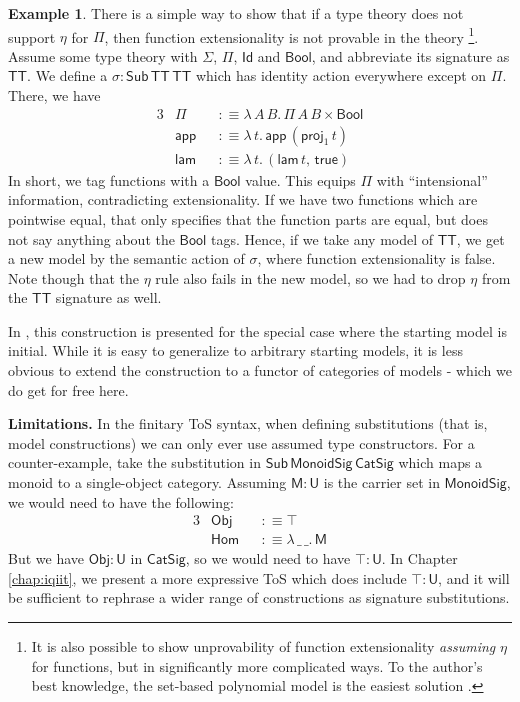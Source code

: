 \documentclass[12pt,a4paper,twoside,openany]{book}
\theoremstyle{remark}
\theoremstyle{definition}
\newtheorem{myexample}{Example}
\theoremstyle{theorem}
\newcommand{\ms}[1]{\mathsf{#1}}
\newcommand{\Sub}{\mathsf{Sub}}
\newcommand{\U}{\mathsf{U}}
\newcommand{\Id}{\mathsf{Id}}
\newcommand{\proj}{\mathsf{proj}}
\newcommand{\app}{\ms{app}}
\newcommand{\Obj}{\ms{Obj}}
\newcommand{\Bool}{\ms{Bool}}
\newcommand{\lam}{\ms{lam}}
\newcommand{\true}{\ms{true}}
\newcommand{\defn}{:\equiv}
\begin{document}
\begin{myexample}
There is a simple way to show that if a type theory does not support $\eta$ for
$\Pi$, then function extensionality is not provable in the theory
\cite{next700}\footnote{It is also possible to show unprovability of function
extensionality \emph{assuming} $\eta$ for functions, but in significantly more
complicated ways. To the author's best knowledge, the set-based polynomial model
is the easiest solution \cite{von2015polynomials}.}.  Assume some type theory with $\Sigma$,
$\Pi$, $\Id$ and $\Bool$, and abbreviate its signature as $\ms{TT}$. We define a
$\sigma : \Sub\,\ms{TT}\,\ms{TT}$ which has identity action everywhere except on
$\Pi$. There, we have
\begin{alignat*}{3}
  &\Pi    &&\defn \lambda\,A\,B.\,\Pi\,A\,B \times \Bool \\
  &\app   &&\defn \lambda\,t.\,\app\,(\proj_1\,t)\\
  &\lam   &&\defn \lambda\,t.\,(\lam\,t,\,\true)
\end{alignat*}
In short, we tag functions with a $\Bool$ value. This equips $\Pi$ with
``intensional'' information, contradicting extensionality. If we have two
functions which are pointwise equal, that only specifies that the function parts
are equal, but does not say anything about the $\Bool$ tags. Hence, if we take
any model of $\ms{TT}$, we get a new model by the semantic action of $\sigma$,
where function extensionality is false. Note though that the $\eta$ rule also
fails in the new model, so we had to drop $\eta$ from the $\ms{TT}$ signature
as well.

In \cite{next700}, this construction is presented for the special case where the
starting model is initial. While it is easy to generalize to arbitrary starting
models, it is less obvious to extend the construction to a functor of categories
of models - which we do get for free here.
\end{myexample}

\textbf{Limitations.} In the finitary ToS syntax, when defining substitutions
(that is, model constructions) we can only ever use assumed type constructors.
For a counter-example, take the substitution in
$\Sub\,\ms{MonoidSig}\,\ms{CatSig}$ which maps a monoid to a single-object
category. Assuming $\ms{M} : \U$ is the carrier set in $\ms{MonoidSig}$, we would
need to have the following:
\begin{alignat*}{3}
  &\ms{Obj} &&\defn \top \\
  &\ms{Hom} &&\defn \lambda\,\_\,\_.\, \ms{M}
\end{alignat*}
But we have $\Obj : \U$ in $\ms{CatSig}$, so we would need to have $\top : \U$.
In Chapter \ref{chap:iqiit}, we present a more expressive ToS which does include
$\top : \U$, and it will be sufficient to rephrase a wider range of constructions
as signature substitutions.
\end{document}
